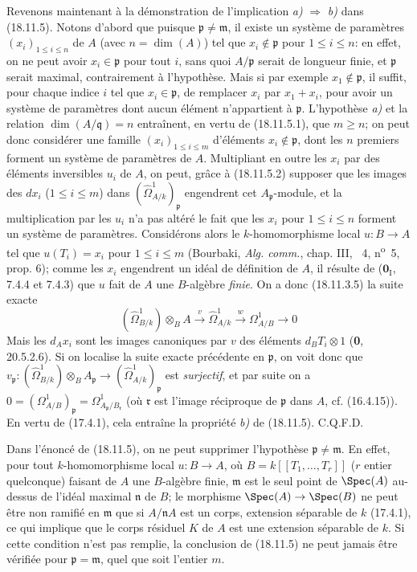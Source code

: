 Revenons maintenant à la démonstration de l'implication \emph{a)} $\Rightarrow$ \emph{b)} dans (18.11.5). Notons d'abord que puisque $\mathfrak p\neq\mathfrak m$, il existe un système de paramètres $(x_i)_{1\leq i\leq n}$ de $A$ (avec $n=\dim(A)$) tel que $x_i\notin\mathfrak p$ pour $1\leq i\leq n$: en effet, on ne peut avoir $x_i\in\mathfrak p$ pour tout $i$, sans quoi $A/\mathfrak p$ serait de longueur finie, et $\mathfrak p$ serait maximal, contrairement à l'hypothèse. Mais si par exemple $x_1\notin\mathfrak p$, il suffit, pour chaque indice $i$ tel que $x_i\in\mathfrak p$, de remplacer $x_i$ par $x_1+x_i$, pour avoir un système de paramètres dont aucun élément n'appartient à $\mathfrak p$. L'hypothèse \emph{a)} et la relation $\dim(A/\mathfrak q)=n$ entraînent, en vertu de (18.11.5.1), que $m\geq n$; on peut donc considérer une famille $(x_i)_{1\leq i\leq m}$ d'éléments $x_i\notin\mathfrak p$, dont les $n$ premiers forment un système de paramètres de $A$. Multipliant en outre les $x_i$ par des éléments inversibles $u_i$ de $A$, on peut, grâce à (18.11.5.2) supposer que les images des $dx_i$ ($1\leq i\leq m$) dans $(\hat{\Omega}^1_{A/k})_{\mathfrak p}$ engendrent cet $A_{\mathfrak p}$-module, et la multiplication par les $u_i$ n'a pas altéré le fait que les $x_i$ pour $1\leq i\leq n$ forment un système de paramètres.
Considérons alors le $k$-homomorphisme local $u:B\to A$ tel que $u(T_i)=x_i$ pour $1\leq i\leq m$ (Bourbaki, \emph{Alg. comm.}, chap. III, \textsection~4, n\textsuperscript{o}~5, prop. 6); comme les $x_i$ engendrent un idéal de définition de $A$, il résulte de ($\mathbf{0}_{\mathrm I}$, 7.4.4 et 7.4.3) que $u$ fait de $A$ une $B$-algèbre \emph{finie}. On a donc (18.11.3.5) la suite exacte
\[
  (\hat{\Omega}^1_{B/k})\otimes_B A\xrightarrow{v}\hat{\Omega}^1_{A/k}\xrightarrow{w}\Omega^1_{A/B}\longrightarrow0
\]
Mais les $d_Ax_i$ sont les images canoniques par $v$ des éléments $d_BT_i\otimes1$ (\textbf{0}, 20.5.2.6). Si on localise la suite exacte précédente en $\mathfrak p$, on voit donc que $v_{\mathfrak p}:(\hat{\Omega}^1_{B/k})\otimes_B A_{\mathfrak p}\to(\hat{\Omega}^1_{A/k})_{\mathfrak p}$ est \emph{surjectif}, et par suite on a $0=(\Omega^1_{A/B})_{\mathfrak p}=\Omega^1_{A_{\mathfrak p}/B_{\mathfrak r}}$ (où $\mathfrak r$ est l'image réciproque de $\mathfrak p$ dans $A$, cf. (16.4.15)). En vertu de (17.4.1), cela entraîne la propriété \emph{b)} de (18.11.5). C.Q.F.D.

\begin{remark}[18.11.6]
\label{IV.18.11.6}
Dans l'énoncé de (18.11.5), on ne peut supprimer l'hypothèse $\mathfrak p\neq\mathfrak m$. En effet, pour tout $k$-homomorphisme local $u:B\to A$, où $B=k[[T_1,\ldots,T_r]]$ ($r$ entier quelconque) faisant de $A$ une $B$-algèbre finie, $\mathfrak m$ est le seul point de $\Spec(A)$ au-dessus de l'idéal maximal $\mathfrak n$ de $B$; le morphisme $\Spec(A)\to\Spec(B)$ ne peut être non ramifié en $\mathfrak m$ que si $A/\mathfrak nA$ est un corps, extension séparable de $k$ (17.4.1), ce qui implique que le corps résiduel $K$ de $A$ est une extension séparable de $k$. Si cette condition n'est pas remplie, la conclusion de (18.11.5) ne peut jamais être vérifiée pour $\mathfrak p=\mathfrak m$, quel que soit l'entier $m$.
\end{remark}

